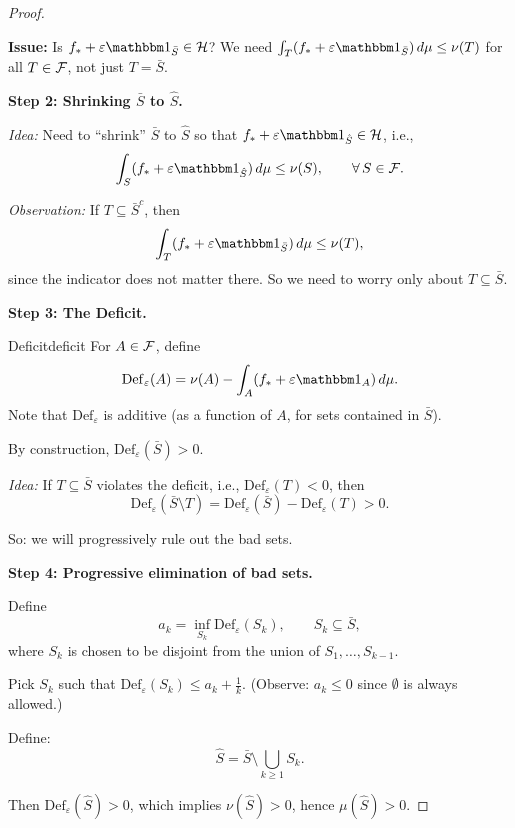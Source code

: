 \begin{proof}
\begin{enumerate}[label=(\roman*)]
    \textbf{Issue:} Is $f_* + \varepsilon \ind_{\bar{S}} \in \cH$?
    We need $\int_T (f_* + \varepsilon \ind_{\bar{S}}) \dmu \leq \nu(T)$ for all $T \in \mathcal{F}$, not just $T = \bar{S}$.
\end{enumerate}

\bigskip
\noindent\textbf{Step 2: Shrinking $\bar{S}$ to $\hat{S}$.}

\emph{Idea:} Need to ``shrink'' $\bar{S}$ to $\hat{S}$ so that $f_* + \varepsilon \ind_{\hat{S}} \in \cH$, i.e.,
\[
    \int_S (f_* + \varepsilon \ind_{\hat{S}}) \dmu \leq \nu(S), \qquad \forall\, S \in \F.
\]

\emph{Observation:} If $T \subseteq \bar{S}^c$, then
\[
    \int_T (f_* + \varepsilon \ind_{\bar{S}}) \dmu \leq \nu(T),
\]
since the indicator does not matter there. So we need to worry only about $T \subseteq \bar{S}$.

\bigskip
\noindent\textbf{Step 3: The Deficit.}

\begin{definition}{Deficit}{deficit}
    For $A \in \mathcal{F}$, define
    \[
        \mathrm{Def}_\varepsilon(A) = \nu(A) - \int_A (f_* + \varepsilon \ind_A) \dmu.
    \]
    Note that $\mathrm{Def}_\varepsilon$ is additive (as a function of $A$, for sets contained in $\bar{S}$).
\end{definition}

By construction, $\mathrm{Def}_\varepsilon(\bar{S}) > 0$.

\medskip
\emph{Idea:} If $T \subseteq \bar{S}$ violates the deficit, i.e., $\mathrm{Def}_\varepsilon(T) < 0$, then
\[
    \mathrm{Def}_\varepsilon(\bar{S} \setminus T) = \mathrm{Def}_\varepsilon(\bar{S}) - \mathrm{Def}_\varepsilon(T) > 0.
\]

So: we will progressively rule out the bad sets.

\bigskip
\noindent\textbf{Step 4: Progressive elimination of bad sets.}

Define
\[
    a_k = \inf_{S_k} \mathrm{Def}_\varepsilon(S_k), \qquad S_k \subseteq \bar{S},
\]
where $S_k$ is chosen to be disjoint from the union of $S_1, \ldots, S_{k-1}$.

Pick $S_k$ such that $\mathrm{Def}_\varepsilon(S_k) \leq a_k + \tfrac{1}{k}$.
(Observe: $a_k \leq 0$ since $\emptyset$ is always allowed.)

Define:
\[
    \hat{S} = \bar{S} \setminus \bigcup_{k \geq 1} S_k.
\]

Then $\mathrm{Def}_\varepsilon(\hat{S}) > 0$, which implies $\nu(\hat{S}) > 0$, hence $\mu(\hat{S}) > 0$.


\end{proof}
